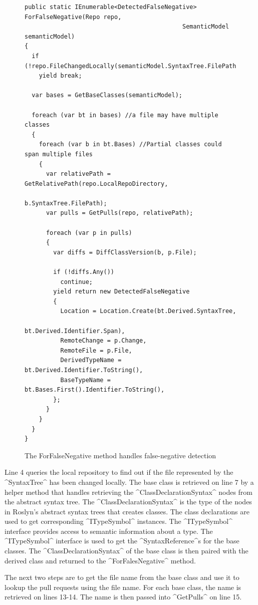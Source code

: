 \documentclass[draftclsnofoot,onecolumn]{IEEEtran}
\begin{document}
\begin{figure}[!h]
\centering
\begin{lstlisting}
public static IEnumerable<DetectedFalseNegative> ForFalseNegative(Repo repo,
                                            SemanticModel semanticModel)
{
  if (!repo.FileChangedLocally(semanticModel.SyntaxTree.FilePath))
    yield break;

  var bases = GetBaseClasses(semanticModel);

  foreach (var bt in bases) //a file may have multiple classes
  {
    foreach (var b in bt.Bases) //Partial classes could span multiple files
    {
      var relativePath = GetRelativePath(repo.LocalRepoDirectory, 
                                                        b.SyntaxTree.FilePath);
      var pulls = GetPulls(repo, relativePath);

      foreach (var p in pulls)
      {
        var diffs = DiffClassVersion(b, p.File);

        if (!diffs.Any())
          continue;
        yield return new DetectedFalseNegative
        {
          Location = Location.Create(bt.Derived.SyntaxTree, 
                                                   bt.Derived.Identifier.Span),
          RemoteChange = p.Change,
          RemoteFile = p.File,
          DerivedTypeName = bt.Derived.Identifier.ToString(),
          BaseTypeName = bt.Bases.First().Identifier.ToString(),
        };
      }
    }
  }
}
\end{lstlisting}
\caption{The ForFalseNegative method handles false-negative detection}
\label{anforfn}
\end{figure}


Line 4 queries the local repository to find out if the file represented by the ^SyntaxTree^ has been changed locally. The base class is retrieved on line 7 by a helper method that handles retrieving the 
^ClassDeclarationSyntax^ nodes from the abstract syntax tree. The ^ClassDeclarationSyntax^ is the type of the nodes in Roslyn's abstract syntax trees that creates classes. The class declarations are used to get corresponding ^ITypeSymbol^ instances. The ^ITypeSymbol^ interface provides access to semantic information about a type. The ^ITypeSymbol^ interface is used to get the ^SyntaxReference^s for the base classes. The ^ClassDeclarationSyntax^ of the base class is then paired with the derived class and returned to the ^ForFalesNegative^ method.

The next two steps are to get the file name from the base class and use it to lookup the pull requests using the file name. For each base class, the name is retrieved on lines 13-14. The name is then passed into ^GetPulls^ on line 15.
\end{document}
